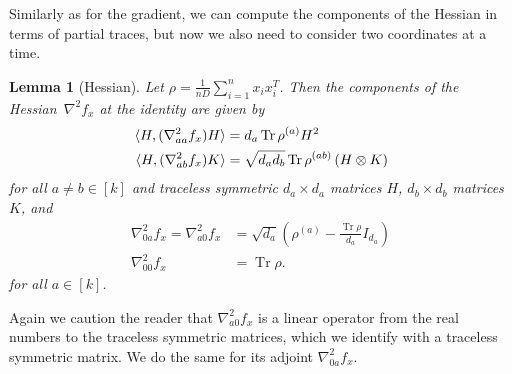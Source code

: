 \documentclass[aos]{imsart}
\newtheorem{lemma}[theorem]{Lemma}
\theoremstyle{definition}
\numberwithin{equation}{section}
\DeclareMathOperator{\tr}{Tr}
\newcommand{\ot}{\otimes}
\newcommand{\samp}{x}
\begin{document}
Similarly as for the gradient, we can compute the components of the Hessian in terms of partial traces, but now we also need to consider two coordinates at a time.


\begin{lemma}[Hessian]\label{lem:hessian}
Let $\rho = \frac{1}{nD}\sum_{i=1}^n \samp_i \samp_i^T$.
Then the components of the Hessian~$\nabla^2 f_{\samp}$ at the identity are given by
\begin{align*}
  \braket{H, (\nabla^2_{aa} f_x) H} &= d_a \tr \rho^{(a)} H^2 \\
  \braket{H, (\nabla^2_{ab} f_x) K} &= \sqrt{d_a d_b} \tr \rho^{(ab)} \left( H \ot K \right)
\end{align*}
for all $a\neq b\in[k]$ and traceless symmetric $d_a\times d_a$ matrices $H$, $d_b\times d_b$ matrices~$K$, and
\begin{align*}
  \nabla^2_{0a} f_x = \nabla^2_{a0} f_x & =  \sqrt{d_a} \left( \rho^{(a)} - \frac{\tr \rho}{d_a} I_{d_a} \right) \\
  \nabla^2_{00} f_x &= \tr \rho.
\end{align*}
for all $a \in [k]$.
\end{lemma}
Again we caution the reader that $\nabla^2_{a0} f_x$ is a linear operator from the real numbers to the traceless symmetric matrices, which we identify with a traceless symmetric matrix. We do the same for its adjoint $\nabla^2_{0a} f_x$.
\end{document}
